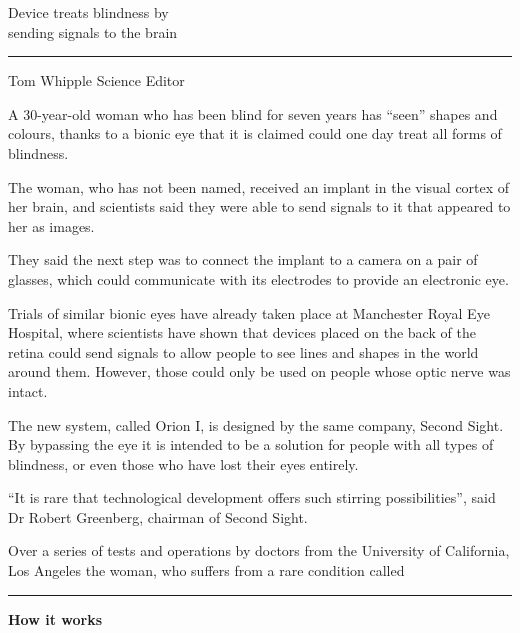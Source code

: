 \documentclass[a4paper]{article}
\newcommand\topLine[2][0ex]{%
  \vspace*{#2\baselineskip}
  \noindent\rule{\columnwidth}{1px}\par
  \vspace{#1}%
}
\newenvironment{stretchLastLine}%
{\begingroup\setlength\parfillskip{0pt}}{\par\endgroup}
\begin{document}
\begingroup
{}
\noindent
Device treats blindness by \\
sending signals to the brain
\endgroup

\begin{multicols}{3}
  \topLine{-1.56}

  \noindent
  Tom Whipple Science Editor

  \vspace{0.7\baselineskip}

  \noindent
  A 30-year-old woman who has been blind for seven years has \enquote{seen}
  shapes and colours, thanks to a bionic eye that it is claimed could one day
  treat all forms of blindness.

  The woman, who has not been named, received an implant in the visual cortex of
  her brain, and scientists said they were able to send signals to it that
  appeared to her as images.

  They said the next step was to connect the implant to a camera on a pair of
  glasses, which could communicate with its electrodes to provide an electronic
  eye.

  Trials of similar bionic eyes have already taken place at Manchester Royal Eye
  Hospital, where scientists have shown that devices placed on the back of the
  retina could send signals to allow people to see lines and shapes in the world
  around them. However, those could only be used on people whose optic nerve was
  intact.

  The new system, called Orion I, is designed by the same company, Second Sight.
  By bypassing the eye it is intended to be a solution for people with all types
  of blindness, or even those who have lost their eyes entirely.

  \enquote{It is rare that technological development offers such stirring
  possibilities}, said Dr Robert Greenberg, chairman of Second Sight.

  \begin{stretchLastLine}
    Over a series of tests and operations by doctors from the University of
    California, Los Angeles the woman, who suffers from a rare condition called
  \end{stretchLastLine}

  \columnbreak

  \topLine[0.6ex]{-1.6}

  \begingroup
  \noindent\hspace{2mm}\textbf{How it works}
  \endgroup


\end{multicols}
\end{document}
